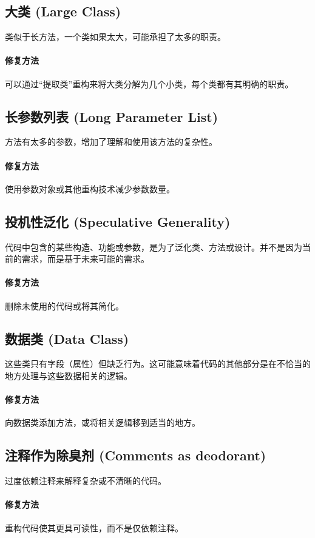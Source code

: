\subsection{大类 (Large Class)}类似于长方法，一个类如果太大，可能承担了太多的职责。
\paragraph{修复方法}可以通过“提取类”重构来将大类分解为几个小类，每个类都有其明确的职责。

\subsection{长参数列表 (Long Parameter List)}方法有太多的参数，增加了理解和使用该方法的复杂性。
\paragraph{修复方法}使用参数对象或其他重构技术减少参数数量。

\subsection{投机性泛化 (Speculative Generality)}代码中包含的某些构造、功能或参数，是为了泛化类、方法或设计。并不是因为当前的需求，而是基于未来可能的需求。
\paragraph{修复方法}删除未使用的代码或将其简化。

\subsection{数据类 (Data Class)}这些类只有字段（属性）但缺乏行为。这可能意味着代码的其他部分是在不恰当的地方处理与这些数据相关的逻辑。
\paragraph{修复方法}向数据类添加方法，或将相关逻辑移到适当的地方。

\subsection{注释作为除臭剂 (Comments as deodorant)}过度依赖注释来解释复杂或不清晰的代码。
\paragraph{修复方法}重构代码使其更具可读性，而不是仅依赖注释。


